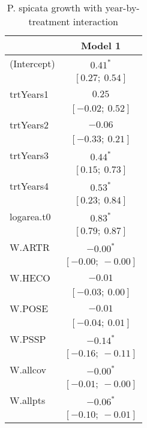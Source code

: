 \documentclass[11pt]{article}
\begin{document}
\begin{table}
\caption{P. spicata growth with year-by-treatment interaction}
\begin{center}
\begin{tabular}{l c }
\hline
 & Model 1 \\
\hline
(Intercept)                      & $0.41^{*}$        \\
                                 & $[0.27;\ 0.54]$   \\
trtYears1                        & $0.25$            \\
                                 & $[-0.02;\ 0.52]$  \\
trtYears2                        & $-0.06$           \\
                                 & $[-0.33;\ 0.21]$  \\
trtYears3                        & $0.44^{*}$        \\
                                 & $[0.15;\ 0.73]$   \\
trtYears4                        & $0.53^{*}$        \\
                                 & $[0.23;\ 0.84]$   \\
logarea.t0                       & $0.83^{*}$        \\
                                 & $[0.79;\ 0.87]$   \\
W.ARTR                           & $-0.00^{*}$       \\
                                 & $[-0.00;\ -0.00]$ \\
W.HECO                           & $-0.01$           \\
                                 & $[-0.03;\ 0.00]$  \\
W.POSE                           & $-0.01$           \\
                                 & $[-0.04;\ 0.01]$  \\
W.PSSP                           & $-0.14^{*}$       \\
                                 & $[-0.16;\ -0.11]$ \\
W.allcov                         & $-0.00^{*}$       \\
                                 & $[-0.01;\ -0.00]$ \\
W.allpts                         & $-0.06^{*}$       \\
                                 & $[-0.10;\ -0.01]$ \\

\end{tabular}
\end{center}
\end{table}
\end{document}
